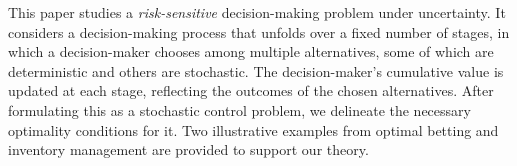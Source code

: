 This paper studies a {\em risk-sensitive} decision-making problem under uncertainty. It considers a decision-making process that unfolds over a fixed number of stages, in which a decision-maker chooses among multiple alternatives, some of which are deterministic and others are stochastic. The decision-maker's cumulative value is updated at each stage, reflecting the outcomes of the chosen alternatives. After formulating this as a stochastic control problem, we delineate the necessary optimality conditions for it. Two illustrative examples from optimal betting and inventory management are provided to support our theory.
